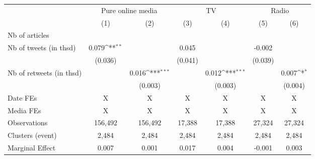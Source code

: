 {
\def\sym#1{\ifmmode^{#1}\else\(^{#1}\)\fi}
\begin{tabular}{l*{6}{c}}
\hline\hline
                    &\multicolumn{2}{c}{Pure online media}      &\multicolumn{2}{c}{TV}                     &\multicolumn{2}{c}{Radio}                  \\\cmidrule(lr){2-3}\cmidrule(lr){4-5}\cmidrule(lr){6-7}
                    &\multicolumn{1}{c}{(1)}         &\multicolumn{1}{c}{(2)}         &\multicolumn{1}{c}{(3)}         &\multicolumn{1}{c}{(4)}         &\multicolumn{1}{c}{(5)}         &\multicolumn{1}{c}{(6)}         \\
\hline
Nb of articles      &                     &                     &                     &                     &                     &                     \\
Nb of tweets (in thsd)&       0.079\sym{**} &                     &       0.045         &                     &      -0.002         &                     \\
                    &     (0.036)         &                     &     (0.041)         &                     &     (0.039)         &                     \\
Nb of retweets (in thsd)&                     &       0.016\sym{***}&                     &       0.012\sym{***}&                     &       0.007\sym{*}  \\
                    &                     &     (0.003)         &                     &     (0.003)         &                     &     (0.004)         \\
\hline
Date FEs            &           X         &           X         &           X         &           X         &           X         &           X         \\
Media FEs           &           X         &           X         &           X         &           X         &           X         &           X         \\
Observations        &     156,492         &     156,492         &      17,388         &      17,388         &      27,324         &      27,324         \\
Clusters (event)    &       2,484         &       2,484         &       2,484         &       2,484         &       2,484         &       2,484         \\
Marginal Effect     &       0.007         &       0.001         &       0.017         &       0.004         &      -0.001         &       0.003         \\
\hline\hline
\end{tabular}
}

